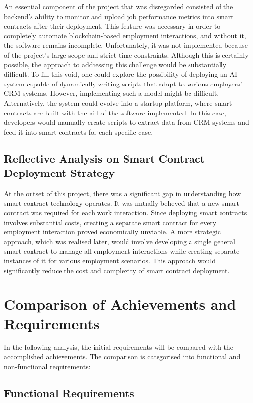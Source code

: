 An essential component of the project that was disregarded consisted of the backend's ability to monitor and upload job performance metrics into smart contracts after their deployment. This feature was necessary in order to completely automate blockchain-based employment interactions, and without it, the software remains incomplete. Unfortunately, it was not implemented because of the project's large scope and strict time constraints. Although this is certainly possible, the approach to addressing this challenge would be substantially difficult. To fill this void, one could explore the possibility of deploying an AI system capable of dynamically writing scripts that adapt to various employers' CRM systems. However, implementing such a model might be difficult. Alternatively, the system could evolve into a startup platform, where smart contracts are built with the aid of the software implemented. In this case, developers would manually create scripts to extract data from CRM systems and feed it into smart contracts for each specific case.  

\subsection{Reflective Analysis on Smart Contract Deployment Strategy}

At the outset of this project, there was a significant gap in understanding how smart contract technology operates. It was initially believed that a new smart contract was required for each work interaction. Since deploying smart contracts involves substantial costs, creating a separate smart contract for every employment interaction proved economically unviable. A more strategic approach, which was realised later, would involve developing a single general smart contract to manage all employment interactions while creating separate instances of it for various employment scenarios. This approach would significantly reduce the cost and complexity of smart contract deployment.

\section{Comparison of Achievements and Requirements}

In the following analysis, the initial requirements will be compared with the accomplished achievements. The comparison is categorised into functional and non-functional requirements:

\subsection{Functional Requirements}

